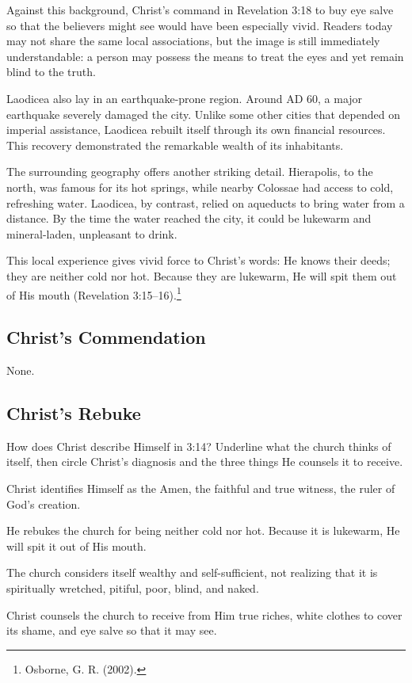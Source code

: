 Against this background, Christ's command in Revelation 3:18 to buy eye salve so that the believers might see would have been especially vivid. Readers today may not share the same local associations, but the image is still immediately understandable: a person may possess the means to treat the eyes and yet remain blind to the truth.

Laodicea also lay in an earthquake-prone region. Around AD 60, a major earthquake severely damaged the city. Unlike some other cities that depended on imperial assistance, Laodicea rebuilt itself through its own financial resources. This recovery demonstrated the remarkable wealth of its inhabitants.

The surrounding geography offers another striking detail. Hierapolis, to the north, was famous for its hot springs, while nearby Colossae had access to cold, refreshing water. Laodicea, by contrast, relied on aqueducts to bring water from a distance. By the time the water reached the city, it could be lukewarm and mineral-laden, unpleasant to drink.

This local experience gives vivid force to Christ's words: He knows their deeds; they are neither cold nor hot. Because they are lukewarm, He will spit them out of His mouth (Revelation 3:15--16).\footnote{Osborne, G. R. (2002).}

\subsection{Christ's Commendation}

None.

\subsection{Christ's Rebuke}

\begin{ScriptureBox2}{How does Christ describe Himself in 3:14? Underline what the church thinks of itself, then circle Christ's diagnosis and the three things He counsels it to receive.}
\item[3:14] Christ identifies Himself as the Amen, the faithful and true witness, the ruler of God's creation.

\item[3:15--16] He rebukes the church for being neither cold nor hot. Because it is lukewarm, He will spit it out of His mouth.

\item[3:17] The church considers itself wealthy and self-sufficient, not realizing that it is spiritually wretched, pitiful, poor, blind, and naked.

\item[3:18] Christ counsels the church to receive from Him true riches, white clothes to cover its shame, and eye salve so that it may see.
\end{ScriptureBox2}

